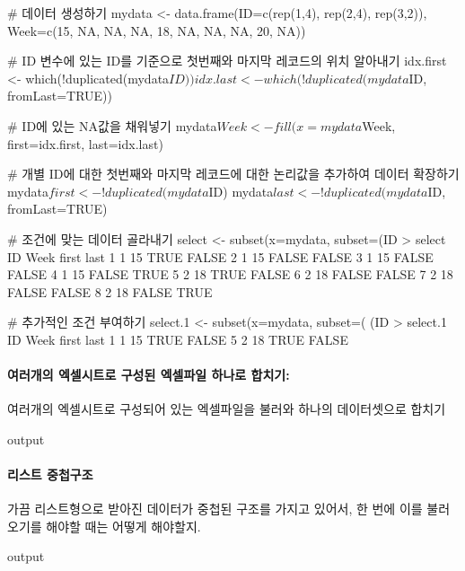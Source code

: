 \documentclass{report}
\begin{document}
\begin{Schunk}
\begin{Soutput}
# 데이터 생성하기
mydata <- data.frame(ID=c(rep(1,4), rep(2,4), rep(3,2)), Week=c(15, NA, NA, NA, 18, NA, NA, NA, 20, NA))

# ID 변수에 있는 ID를 기준으로 첫번째와 마지막 레코드의 위치 알아내기 
idx.first <- which(!duplicated(mydata$ID))
idx.last <- which(!duplicated(mydata$ID, fromLast=TRUE))

# ID에 있는 NA값을 채워넣기 
mydata$Week <- fill(x=mydata$Week, first=idx.first, last=idx.last)

# 개별 ID에 대한 첫번째와 마지막 레코드에 대한 논리값을 추가하여 데이터 확장하기 
mydata$first <- !duplicated(mydata$ID)
mydata$last <- !duplicated(mydata$ID, fromLast=TRUE)

# 조건에 맞는 데이터 골라내기 
select <- subset(x=mydata, subset=(ID %
> select
  ID Week first  last
1  1   15  TRUE FALSE
2  1   15 FALSE FALSE
3  1   15 FALSE FALSE
4  1   15 FALSE  TRUE
5  2   18  TRUE FALSE
6  2   18 FALSE FALSE
7  2   18 FALSE FALSE
8  2   18 FALSE  TRUE

# 추가적인 조건 부여하기
select.1 <- subset(x=mydata, subset=( (ID %
> select.1
  ID Week first  last
1  1   15  TRUE FALSE
5  2   18  TRUE FALSE
\end{Soutput}
\end{Schunk}


\paragraph{여러개의 엑셀시트로 구성된 엑셀파일 하나로 합치기:} 여러개의 엑셀시트로 구성되어 있는 엑셀파일을 불러와 하나의 데이터셋으로 합치기
\begin{Schunk}
\begin{Soutput}
output
\end{Soutput}
\end{Schunk}

\paragraph{리스트 중첩구조} 
가끔 리스트형으로 받아진 데이터가 중첩된 구조를 가지고 있어서, 한 번에 이를 불러오기를 해야할 때는 어떻게 해야할지.
\begin{Schunk}
\begin{Soutput}
output
\end{Soutput}
\end{Schunk}
\end{document}
